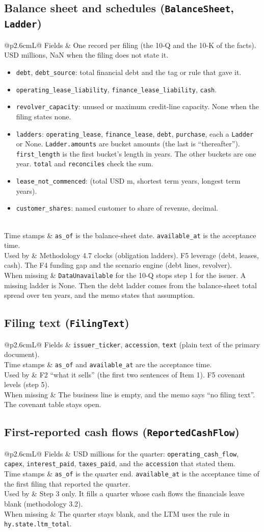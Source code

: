 \documentclass[11pt,a4paper]{article}
\makeatletter
\newcommand{\code}[1]{\texttt{\small #1}}
\newcommand{\kind}[5]{%
\subsection{#1}
\noindent\begin{tabularx}{\linewidth}{@{}p{2.6cm}L@{}}
\toprule
Fields & #2\\\midrule
Time stamps & #3\\\midrule
Used by & #4\\\midrule
When missing & #5\\\bottomrule
\end{tabularx}}
\makeatother
\begin{document}
\kind{Balance sheet and schedules (\code{BalanceSheet}, \code{Ladder})}
{One record per filing (the 10-Q and the 10-K of the facts). USD millions, NaN when the filing does not state it.
\begin{itemize}
\item \code{debt}, \code{debt\_source}: total financial debt and the tag or rule that gave it.
\item \code{operating\_lease\_liability}, \code{finance\_lease\_liability}, \code{cash}.
\item \code{revolver\_capacity}: unused or maximum credit-line capacity. None when the filing states none.
\item \code{ladders}: \code{operating\_lease}, \code{finance\_lease}, \code{debt}, \code{purchase}, each a \code{Ladder} or
  None. \code{Ladder.amounts} are bucket amounts (the last is ``thereafter''). \code{first\_length} is the first
  bucket's length in years. The other buckets are one year. \code{total} and \code{reconciles} check the sum.
\item \code{lease\_not\_commenced}: (total USD m, shortest term years, longest term years).
\item \code{customer\_shares}: named customer to share of revenue, decimal.
\end{itemize}}
{\code{as\_of} is the balance-sheet date. \code{available\_at} is the acceptance time.}
{Methodology 4.7 clocks (obligation ladders). F5 leverage (debt, leases, cash). The F4 funding gap and the scenario
engine (debt lines, revolver).}
{\code{DataUnavailable} for the 10-Q stops step 1 for the issuer. A missing ladder is None. Then the debt ladder comes
from the balance-sheet total spread over ten years, and the memo states that assumption.}

\kind{Filing text (\code{FilingText})}
{\code{issuer\_ticker}, \code{accession}, \code{text} (plain text of the primary document).}
{\code{as\_of} and \code{available\_at} are the acceptance time.}
{F2 ``what it sells'' (the first two sentences of Item 1). F5 covenant levels (step 5).}
{The business line is empty, and the memo says ``no filing text''. The covenant table stays open.}

\kind{First-reported cash flows (\code{ReportedCashFlow})}
{USD millions for the quarter: \code{operating\_cash\_flow}, \code{capex}, \code{interest\_paid}, \code{taxes\_paid},
and the \code{accession} that stated them.}
{\code{as\_of} is the quarter end. \code{available\_at} is the acceptance time of the first filing that reported the
quarter.}
{Step 3 only. It fills a quarter whose cash flows the financials leave blank (methodology 3.2).}
{The quarter stays blank, and the LTM uses the rule in \code{hy.state.ltm\_total}.}
\end{document}
